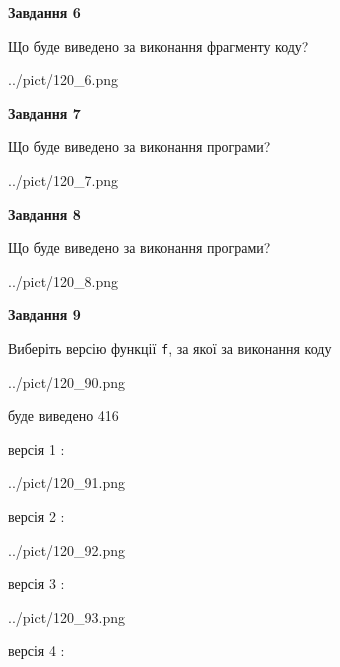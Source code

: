 \documentclass[12pt, ukrainian]{article}
\def\code#1{\Verb!#1!}
\begin{document}
{\begin {large}
{\begin {center}\textbf{Завдання 6}\end {center}}

Що буде виведено за виконання фрагменту коду?\par
\begin{center}
	{../pict/120_6.png}
\end{center}
\newpage

{\begin {center}\textbf{Завдання 7}\end {center}}

Що буде виведено за виконання програми?\par
\begin{center}
	{../pict/120_7.png}
\end{center}
\newpage

{\begin {center}\textbf{Завдання 8}\end {center}}

Що буде виведено за виконання програми?\par
\begin{center}
	{../pict/120_8.png}
\end{center}
\newpage

{\begin {center}\textbf{Завдання 9}\end {center}}

Виберіть версію функції \code{f}, за якої за виконання коду
\begin{center}
	{../pict/120_90.png}
\end{center}
буде виведено 416

\vspace{5mm}
версія 1 :

\begin{center}
	{../pict/120_91.png}
\end{center}
версія 2 :

\begin{center}
	{../pict/120_92.png}
\end{center}
версія 3 :

\begin{center}
	{../pict/120_93.png}
\end{center}
версія 4 :


\end{large}}
\end{document}
